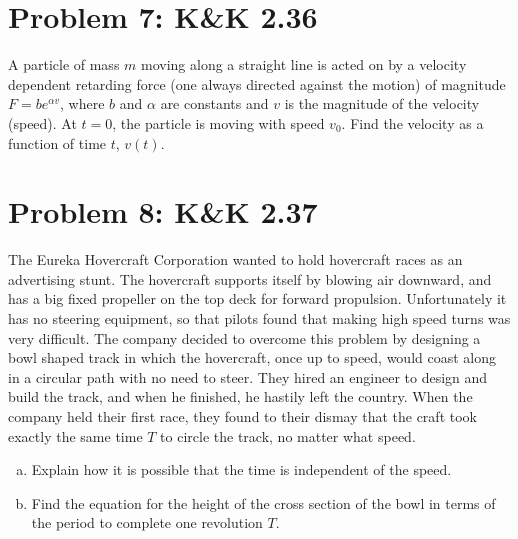 \documentclass[problems]{esg8012pset}
\begin{document}
\section*{Problem 7: K\&K 2.36}
  A particle of mass $m$ moving along a straight line is acted on by a velocity dependent retarding force (one always directed against the motion) of magnitude $F = be^{\alpha v}$, where $b$ and $\alpha$ are constants and $v$ is the magnitude of the velocity (speed). At $t = 0$, the particle is moving with speed $v_0$. Find the velocity as a function of time $t$, $v(t)$.
\section*{Problem 8: K\&K 2.37}
  The Eureka Hovercraft Corporation wanted to hold hovercraft races as an advertising stunt. The hovercraft supports itself by blowing air downward, and has a big fixed propeller on the top deck for forward propulsion. Unfortunately it has no steering equipment, so that pilots found that making high speed turns was very difficult. The company decided to overcome this problem by designing a bowl shaped track in which the hovercraft, once up to speed, would coast along in a circular path with no need to steer. They hired an engineer to design and build the track, and when he finished, he hastily left the country. When the company held their first race, they found to their dismay that the craft took exactly the same time $T$ to circle the track, no matter what speed.
  \begin{enumerate}[a)]
    \item Explain how it is possible that the time is independent of the speed.
    \item Find the equation for the height of the cross section of the bowl in terms of the period to complete one revolution $T$.
  \end{enumerate}
\end{document}
